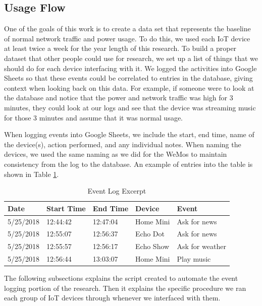 \subsection{Usage Flow}

One of the goals of this work is to create a data set that represents the baseline of normal network traffic and power usage. To do this, we used each IoT device at least twice a week for the year length of this research. To build a proper dataset that other people could use for research, we set up a list of things that we should do for each device interfacing with it. We logged the activities into Google Sheets so that these events could be correlated to entries in the database, giving context when looking back on this data. For example, if someone were to look at the database and notice that the power and network traffic was high for 3 minutes, they could look at our logs and see that the device was streaming music for those 3 minutes and assume that it was normal usage.

When logging events into Google Sheets, we include the start, end time, name of the device(s), action performed, and any individual notes. When naming the devices, we used the same naming as we did for the WeMos to maintain consistency from the log to the database. An example of entries into the table is shown in Table \ref{tab:events}.

\begin{table}[H]
    \centering
    \caption{Event Log Excerpt}
    \begin{tabular}{@{}lllll@{}}
        \toprule
        Date & Start Time & End Time & Device & Event \\ \midrule
        5/25/2018 & 12:44:42 & 12:47:04 & Home Mini & Ask for news \\
        5/25/2018 & 12:55:07 & 12:56:37 & Echo Dot & Ask for news \\
        5/25/2018 & 12:55:57 & 12:56:17 & Echo Show & Ask for weather \\
        5/25/2018 & 12:56:44 & 13:03:07 & Home Mini & Play music \\ \bottomrule
        \end{tabular}
    \label{tab:events}
\end{table}

The following subsections explains the script created to automate the event logging portion of the research. Then it explains the specific procedure we ran each group of IoT devices through whenever we interfaced with them.

